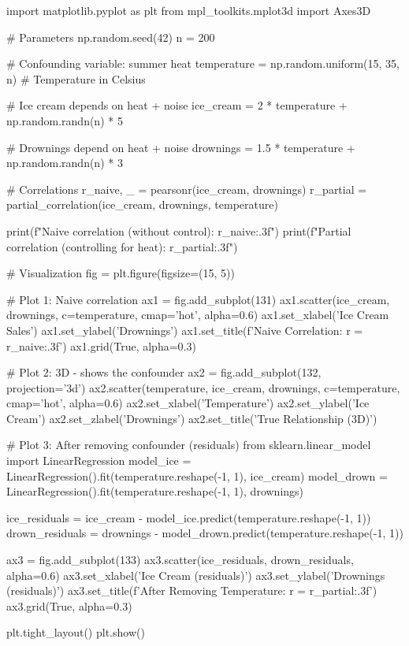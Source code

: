 \begin{pythonbox}
import matplotlib.pyplot as plt
from mpl_toolkits.mplot3d import Axes3D

# Parameters
np.random.seed(42)
n = 200

# Confounding variable: summer heat
temperature = np.random.uniform(15, 35, n)  # Temperature in Celsius

# Ice cream depends on heat + noise
ice_cream = 2 * temperature + np.random.randn(n) * 5

# Drownings depend on heat + noise
drownings = 1.5 * temperature + np.random.randn(n) * 3

# Correlations
r_naive, _ = pearsonr(ice_cream, drownings)
r_partial = partial_correlation(ice_cream, drownings, temperature)

print(f"Naive correlation (without control): {r_naive:.3f}")
print(f"Partial correlation (controlling for heat): {r_partial:.3f}")

# Visualization
fig = plt.figure(figsize=(15, 5))

# Plot 1: Naive correlation
ax1 = fig.add_subplot(131)
ax1.scatter(ice_cream, drownings, c=temperature, cmap='hot', alpha=0.6)
ax1.set_xlabel('Ice Cream Sales')
ax1.set_ylabel('Drownings')
ax1.set_title(f'Naive Correlation: r = {r_naive:.3f}')
ax1.grid(True, alpha=0.3)

# Plot 2: 3D - shows the confounder
ax2 = fig.add_subplot(132, projection='3d')
ax2.scatter(temperature, ice_cream, drownings, c=temperature, cmap='hot', alpha=0.6)
ax2.set_xlabel('Temperature')
ax2.set_ylabel('Ice Cream')
ax2.set_zlabel('Drownings')
ax2.set_title('True Relationship (3D)')

# Plot 3: After removing confounder (residuals)
from sklearn.linear_model import LinearRegression
model_ice = LinearRegression().fit(temperature.reshape(-1, 1), ice_cream)
model_drown = LinearRegression().fit(temperature.reshape(-1, 1), drownings)

ice_residuals = ice_cream - model_ice.predict(temperature.reshape(-1, 1))
drown_residuals = drownings - model_drown.predict(temperature.reshape(-1, 1))

ax3 = fig.add_subplot(133)
ax3.scatter(ice_residuals, drown_residuals, alpha=0.6)
ax3.set_xlabel('Ice Cream (residuals)')
ax3.set_ylabel('Drownings (residuals)')
ax3.set_title(f'After Removing Temperature: r = {r_partial:.3f}')
ax3.grid(True, alpha=0.3)

plt.tight_layout()
plt.show()
\end{pythonbox}

